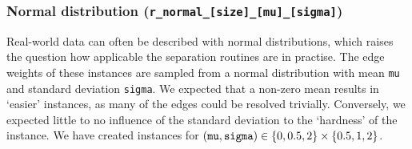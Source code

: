 \subsubsection{Normal distribution (\texttt{r\_normal\_[size]\_[mu]\_[sigma]})}\label{subsubsec:data_random_normal}
Real-world data can often be described with normal distributions, which raises the question how applicable the separation routines are in practise.
The edge weights of these instances are sampled from a normal distribution with mean \texttt{mu} and standard deviation \texttt{sigma}.
We expected that a non-zero mean results in ‘easier’ instances, as many of the edges could be resolved trivially.
Conversely, we expected little to no influence of the standard deviation to the ‘hardness’ of the instance.
We have created instances for $(\text{\texttt{mu}}, \text{\texttt{sigma}}) \in \left\{ 0, 0.5, 2 \right\} \times \left\{ 0.5, 1, 2 \right\}$.

